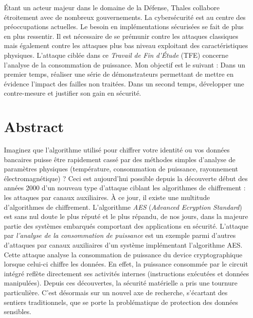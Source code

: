 \documentclass[oneside]{book}
\begin{document}
Étant un acteur majeur dans le domaine de la Défense, Thales collabore étroitement avec de nombreux gouvernements. La cybersécurité est au centre des préoccupations actuelles. Le besoin en implémentations sécurisées se fait de plus en plus ressentir. Il est nécessaire de se prémunir contre les attaques classiques mais également contre les attaques plus bas niveau exploitant des caractéristiques physiques. L'attaque ciblée dans ce \textit{Travail de Fin d'Étude} (TFE) concerne l'analyse de la consommation de puissance. Mon objectif est le suivant : Dans un premier temps, réaliser une série de démonstrateurs permettant de mettre en évidence l'impact des failles non traitées. Dans un second temps, développer une contre-mesure et justifier son gain en sécurité.

\newpage

{} %
\null\vfil
\section*{\centering Abstract}
Imaginez que l'algorithme utilisé pour chiffrer votre identité ou vos données bancaires puisse être rapidement cassé par des méthodes simples d'analyse de paramètres physiques (température, consommation de puissance, rayonnement électromagnétique) ? Ceci est aujourd'hui possible depuis la découverte début des années 2000 d'un nouveau type d'attaque ciblant les algorithmes de chiffrement : les attaques par canaux auxiliaires. À ce jour, il existe une multitude d’algorithmes de chiffrement. L’algorithme \textit{AES} (\textit{Advanced Ecryption Standard}) est sans nul doute le plus réputé et le plus répandu, de nos jours, dans la majeure partie des systèmes embarqués comportant des applications en sécurité. L'attaque par \textit{l'analyse de la consommation de puissance} est un exemple parmi d'autres d'attaques par canaux auxiliaires d'un système implémentant l'algorithme AES. Cette attaque analyse la consommation de puissance du device cryptographique lorsque celui-ci chiffre les données. En effet, la puissance consommée par le circuit intégré reflète directement ses activités internes (instructions exécutées et données manipulées). Depuis ces découvertes, la sécurité matérielle a pris une tournure particulière. C’est désormais sur un nouvel axe de recherche, s’écartant des sentiers traditionnels, que se porte la problématique de protection des données sensibles. 
\end{document}
